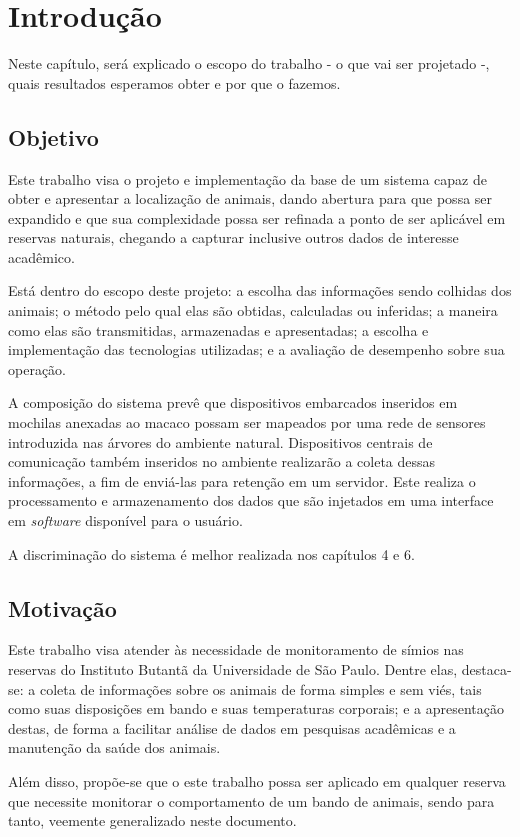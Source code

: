 \chapter{Introdução}
Neste capítulo, será explicado o escopo do trabalho - o que vai ser projetado -, quais resultados esperamos obter e por que o fazemos.

\section{Objetivo}
Este trabalho visa o projeto e implementação da base de um sistema capaz de obter e apresentar a localização de animais, dando abertura para que possa ser expandido e que sua complexidade possa ser refinada a ponto de ser aplicável em reservas naturais, chegando a capturar inclusive outros dados de interesse acadêmico.

Está dentro do escopo deste projeto: a escolha das informações sendo colhidas dos animais; o método pelo qual elas são obtidas, calculadas ou inferidas; a maneira como elas são transmitidas, armazenadas e apresentadas; a escolha e implementação das tecnologias utilizadas; e a avaliação de desempenho sobre sua operação.

A composição do sistema prevê que dispositivos embarcados inseridos em mochilas anexadas ao macaco possam ser mapeados por uma rede de sensores introduzida nas árvores do ambiente natural. Dispositivos centrais de comunicação também inseridos no ambiente realizarão a coleta dessas informações, a fim de enviá-las para retenção em um servidor. Este realiza o processamento e armazenamento dos dados que são injetados em uma interface em \emph{software} disponível para o usuário.

A discriminação do sistema é melhor realizada nos capítulos 4 e 6.

\section{Motivação}
Este trabalho visa atender às necessidade de monitoramento de símios nas reservas do Instituto Butantã da Universidade de São Paulo. Dentre elas, destaca-se: a coleta de informações sobre os animais de forma simples e sem viés, tais como suas disposições em bando e suas temperaturas corporais; e a apresentação destas, de forma a facilitar análise de dados em  pesquisas acadêmicas e a manutenção da saúde dos animais.

Além disso, propõe-se que o este trabalho possa ser aplicado em qualquer reserva que necessite monitorar o comportamento de um bando de animais, sendo para tanto, veemente generalizado neste documento.

